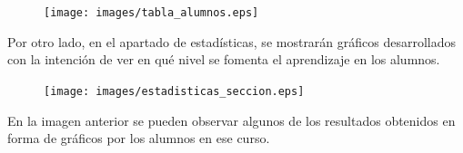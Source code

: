 \begin{figure}[!th]
\begin{center}
\texttt{[image: images/tabla\_alumnos.eps]}
\label{fig:21}
\end{center}
\end{figure}

Por otro lado, en el apartado de estadísticas, se mostrarán gráficos desarrollados con la intención de ver en qué nivel se fomenta el aprendizaje en los alumnos.

\begin{figure}[!th]
\begin{center}
\texttt{[image: images/estadisticas\_seccion.eps]}
\label{fig:22}
\end{center}
\end{figure}

En la imagen anterior se pueden observar algunos de los resultados obtenidos en forma de gráficos por los alumnos en ese curso.